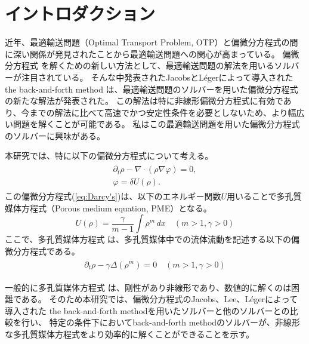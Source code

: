 \chapter{イントロダクション} \label{ch:intro}

近年、最適輸送問題（Optimal Transport Problem, OTP）と偏微分方程式の間に深い関係が発見されたことから最適輸送問題への関心が高まっている。
偏微分方程式 を解くための新しい方法として、最適輸送問題の解法を用いるソルバーが注目されている。
そんな中発表されたJacobsとLégerによって導入された the back-and-forth method は、最適輸送問題のソルバーを用いた偏微分方程式の新たな解法が発表された\cite{MR4238775}。
この解法は特に非線形偏微分方程式に有効であり、今までの解法に比べて高速でかつ安定性条件を必要としないため、より幅広い問題を解くことが可能である。
私はこの最適輸送問題を用いた偏微分方程式のソルバーに興味がある。

本研究では、特に以下の偏微分方程式について考える。
\begin{align}
    \begin{split}
        \label{eq:Darcy's}
        \partial_t \rho - \nabla \cdot (\rho \nabla \varphi) = 0, \\
        \varphi = \delta U(\rho).
    \end{split}
\end{align}
この偏微分方程式(\ref{eq:Darcy's})は、以下のエネルギー関数$U$用いることで多孔質媒体方程式（Porous medium equation, PME）となる。
$$
    U(\rho) = \frac{\gamma}{m - 1} \int \rho^m \,dx \quad(m > 1, \gamma > 0)
$$
ここで、多孔質媒体方程式 は、多孔質媒体中での流体流動を記述する以下の偏微分方程式である。
\begin{align}
    \begin{split}
        \label{eq:PME}
        \partial_t \rho - \gamma\Delta(\rho^m) = 0  \quad(m > 1, \gamma > 0)
    \end{split}
\end{align}

一般的に多孔質媒体方程式 は、剛性があり非線形であり、数値的に解くのは困難である。
そのため本研究では、偏微分方程式のJacobs、Lee、Légerによって導入された the back-and-forth methodを用いたソルバーと他のソルバーとの比較を行い、
特定の条件下においてback-and-forth methodのソルバーが、非線形な多孔質媒体方程式をより効率的に解くことができることを示す。


